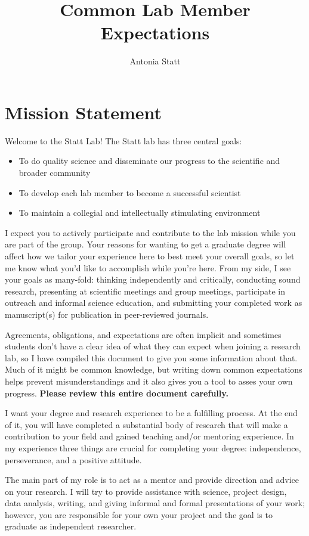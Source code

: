 \documentclass{article}
\title{Common Lab Member Expectations}
\author{Antonia Statt}
\begin{document}
\maketitle

\section*{Mission Statement}
Welcome to the Statt Lab! The Statt lab has three central goals:

\begin{itemize}
	\item To do quality science and disseminate our progress to the scientific and broader community 
	\item To develop each lab member to become a successful scientist
	\item To maintain a collegial and intellectually stimulating environment
\end{itemize}

I expect you to actively participate and contribute to the lab mission while you are part of the  group.
Your reasons for wanting to get a graduate degree will affect how we tailor your experience here to best meet your overall goals, so let me know what you’d like to accomplish while you’re here. From my side, I see your goals as many-fold: thinking independently and critically, conducting sound research, presenting at scientific meetings and group meetings, participate in outreach and informal science education, and submitting your completed work as manuscript(s) for publication in peer-reviewed journals.

Agreements, obligations, and expectations are often implicit and sometimes students don't have a  clear idea of what they can expect when joining a research lab, so I have compiled this document to give you some information about  that. 
Much of it might be common knowledge, but writing down common expectations helps prevent misunderstandings and it also gives you a tool to asses your own progress.
\textbf{Please review this entire document carefully. }

I want your  degree and research experience to be a fulfilling process. 
At the end of it, you will have completed a substantial body of research that will make a contribution to your field and gained teaching and/or mentoring experience. In my experience three things are crucial for completing your degree:  independence, perseverance, and a positive attitude.

The main part of my role is to act as a mentor and provide direction and advice on your research. I will try to provide assistance with science, project design, data analysis, writing, and giving informal and formal presentations of your work; however, you are responsible for your own your project and the goal is to graduate as independent researcher. 
 
\end{document}
